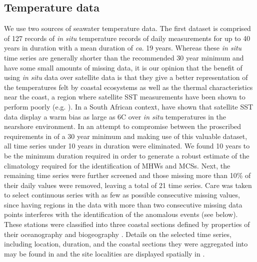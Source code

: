 \documentclass[a4paper,10pt,review]{elsarticle}
\begin{document}
\subsection{Temperature data}
We use two sources of seawater temperature data. The first dataset is comprised of 127 records of \emph{in situ} temperature records of daily measurements for up to 40 years in duration with a mean duration of \emph{ca}. 19 years. Whereas these \emph{in situ} time series are generally shorter than the recommended 30 year minimum \citep{Hobday2016} and have some small amounts of missing data, it is our opinion that the benefit of using \emph{in situ} data over satellite data is that they give a better representation of the temperatures felt by coastal ecosystems as well as the thermal characteristics near the coast, a region where satellite SST measurements have been shown to perform poorly (e.g. \cite{Smale2009, Castillo2010}). In a South African context, \citet{Smit2013} have shown that satellite SST data display a warm bias as large as 6\degree C over \emph{in situ} temperatures in the nearshore environment. In an attempt to compromise between the proscribed requirements in \citet{Hobday2016} of a 30 year minimum and making use of this valuable dataset, all time series under 10 years in duration were eliminated. We found 10 years to be the minimum duration required in order to generate a robust estimate of the climatology required for the identification of MHWs and MCSs. Next, the remaining time series were further screened and those missing more than 10\% of their daily values were removed, leaving a total of 21 time series. Care was taken to select continuous series with as few as possible consecutive missing values, since having regions in the data with more than two consecutive missing data points interferes with the identification of the anomalous events (see below). These stations were classified into three coastal sections defined by properties of their oceanography and biogeography \cite{Smit2013}. Details on the selected time series, including location, duration, and the coastal sections they were aggregated into may be found in  and the site localities are displayed spatially in .
\end{document}
